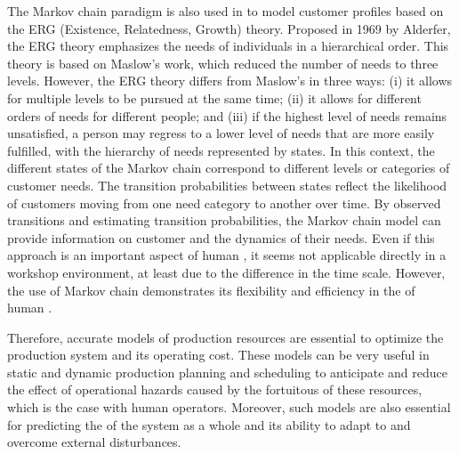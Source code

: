 \documentclass[review,12pt, 3p, times]{elsarticle}
\begin{document}
The Markov chain paradigm is also used in \citep{chang2008synthesized} to model customer profiles based on the ERG (Existence, Relatedness, Growth) theory. Proposed in 1969  by Alderfer, the ERG theory emphasizes the needs of individuals in a hierarchical order. This theory is based on Maslow's work, which reduced the number of needs to three levels. However, the ERG theory differs from Maslow's in three ways: (i) it allows for multiple levels to be pursued at the same time; (ii) it allows for different orders of needs for different people; and (iii) if the highest level of needs remains unsatisfied, a person may regress to a lower level of needs that are more easily fulfilled, with the hierarchy of needs represented by states. In this context, the different states of the Markov chain correspond to different levels or categories of customer needs. The transition probabilities between states reflect the likelihood of customers moving from one need category to another over time. By  observed transitions and estimating transition probabilities, the Markov chain model can provide information on customer  and the dynamics of their needs. Even if this approach is  an important aspect of human , it seems not applicable directly in a workshop environment, at least due to the difference in the time scale. However, the use of  Markov chain demonstrates its flexibility and efficiency in the  of human .  

Therefore, accurate  models of production resources are essential to optimize the production system and its operating cost. These models can be very useful in static and dynamic production planning and scheduling to anticipate and reduce the effect of operational hazards caused by the fortuitous  of these resources, which is the case with human operators. Moreover, such models are also essential for predicting the  of the system as a whole and its ability to adapt to and overcome external disturbances.
\end{document}
